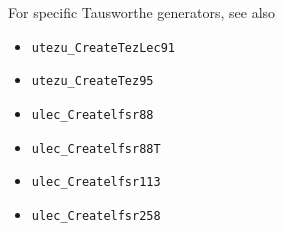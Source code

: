 For specific Tausworthe generators, see also
{
\setlength{\partopsep}{0pt}
\setlength{\parskip}{0pt}
\setlength{\topsep}{0pt}
\setlength{\itemsep}{0pt}

\begin{itemize}
\item {\tt utezu\_CreateTezLec91}
\item {\tt utezu\_CreateTez95}
\end{itemize}

\bigskip
\begin{itemize}
\item {\tt ulec\_Createlfsr88}
\item {\tt ulec\_Createlfsr88T}
\item {\tt ulec\_Createlfsr113}
\item {\tt ulec\_Createlfsr258}
\end{itemize}
}

